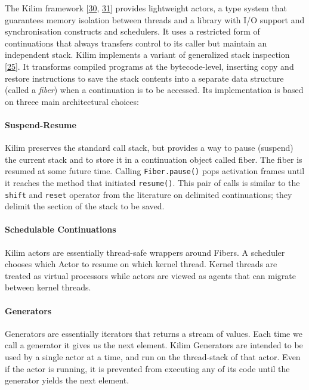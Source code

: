 \documentclass[12pt,a4paper,oneside,openright]{book}
\let\oldparagraph\paragraph
\renewcommand{\paragraph}[1]{\oldparagraph{#1}\mbox{}}
\begin{document}
The Kilim framework {[}\hyperref[ref-Srinivasan2006]{30},
\hyperref[ref-Bolton2000]{31}{]} provides lightweight actors, a type
system that guarantees memory isolation between threads and a library
with I/O support and synchronisation constructs and schedulers. It uses
a restricted form of continuations that always transfers control to its
caller but maintain an independent stack. Kilim implements a variant of
generalized stack inspection {[}\hyperref[ref-Pettyjohn2005]{25}{]}. It
transforms compiled programs at the bytecode-level, inserting copy and
restore instructions to save the stack contents into a separate data
structure (called a \emph{fiber}) when a continuation is to be accessed.
Its implementation is based on threee main architectural choices:

\paragraph{Suspend-Resume}\label{suspend-resume}

Kilim preserves the standard call stack, but provides a way to pause
(suspend) the current stack and to store it in a continuation object
called fiber. The fiber is resumed at some future time. Calling
\texttt{Fiber.pause()} pops activation frames until it reaches the
method that initiated \texttt{resume()}. This pair of calls is similar
to the \texttt{shift} and \texttt{reset} operator from the literature on
delimited continuations; they delimit the section of the stack to be
saved.

\paragraph{Schedulable Continuations}\label{schedulable-continuations}

Kilim actors are essentially thread-safe wrappers around Fibers. A
scheduler chooses which Actor to resume on which kernel thread. Kernel
threads are treated as virtual processors while actors are viewed as
agents that can migrate between kernel threads.

\paragraph{Generators}\label{generators}

Generators are essentially iterators that returns a stream of values.
Each time we call a generator it gives us the next element. Kilim
Generators are intended to be used by a single actor at a time, and run
on the thread-stack of that actor. Even if the actor is running, it is
prevented from executing any of its code until the generator yields the
next element.
\end{document}
